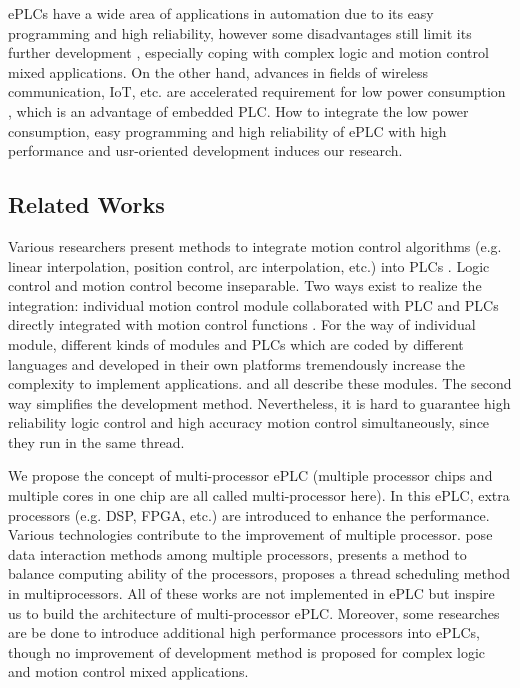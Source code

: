 \documentclass[journal,UTF8]{IEEEtran}
\begin{document}
ePLCs have a wide area of applications in automation due to its easy programming and high reliability, however some disadvantages still limit its further development \cite{Hossain2014Advanced}, especially coping with complex logic and motion control mixed applications. On the other hand, advances in fields of wireless communication, IoT, etc. are accelerated requirement for low power consumption \cite{Arshad2017Green}, which is an advantage of embedded PLC. How to integrate the low power consumption, easy programming and high reliability of ePLC with high performance and usr-oriented development induces our research.

\subsection{Related Works}
Various researchers present methods to integrate motion control algorithms (e.g. linear interpolation, position control, arc interpolation, etc.) into PLCs \cite{Ioannides2004Design,Shi2016The,Fang2017Design}. Logic control and motion control become inseparable. Two ways exist to realize the integration: individual motion control module collaborated with PLC \cite{Peng2011Linear} and PLCs directly integrated with motion control functions \cite{Ioannides2004Design,syaichu2011model}. For the way of individual module, different kinds of modules and PLCs which are coded by different languages and developed in their own platforms tremendously increase the complexity to implement applications. \cite{Peng2011Linear,Qian2014A}  and \cite{Panasonic2011Programmable} all describe these modules. The second way simplifies the development method. Nevertheless, it is hard to guarantee high reliability logic control and high accuracy motion control simultaneously, since they run in the same thread. 

We propose the concept of multi-processor ePLC (multiple processor chips and multiple cores in one chip are all called multi-processor here). In this ePLC, extra processors (e.g. DSP, FPGA, etc.) are introduced to enhance the performance. Various technologies contribute to the improvement of multiple processor. \cite{Dubois2002Memory,Patel2006Processor} pose data interaction methods among multiple processors, \cite{Zhu2016Providing} presents a method to balance computing ability of the processors, \cite{Albarakat2017MTB} proposes a thread scheduling method in multiprocessors. All of these works are not implemented in ePLC but inspire us to build the architecture of multi-processor ePLC. Moreover, some researches \cite{Hajduk2015Architecture, Chmiel2016An} are be done to introduce additional high performance processors into ePLCs, though no improvement of development method is proposed for complex logic and motion control mixed applications.
\end{document}
